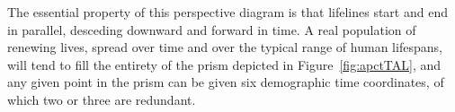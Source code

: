 \documentclass[12pt,oneside,a4paper]{article} %
\begin{document}
The essential property of this perspective diagram is that lifelines
start and end in parallel, desceding downward and forward in time. A real
population of renewing lives, spread over time and over the typical range of
human lifespans, will tend to fill the entirety of the prism depicted in
Figure~\ref{fig:apctTAL}, and any given point in the prism can be given six
demographic time coordinates, of which two or three are redundant.



\end{document}
